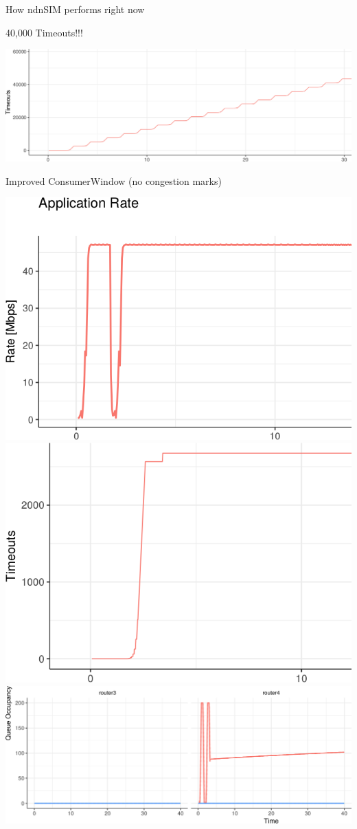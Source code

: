 \begin{frame}{How ndnSIM performs right now}

40,000 Timeouts!!!

\includegraphics[width=\linewidth]{figs/cons2.png}


\end{frame}


\begin{frame}{Improved ConsumerWindow (no congestion marks)}

\includegraphics[width=0.48\linewidth]{figs/cons_new_rate.png}
\hspace{.1em}
\pause
\includegraphics[width=0.48\linewidth]{figs/cons_new_timeouts.png}\\
\pause
\includegraphics[width=\linewidth]{figs/cons_new_queue.png}

\end{frame}



